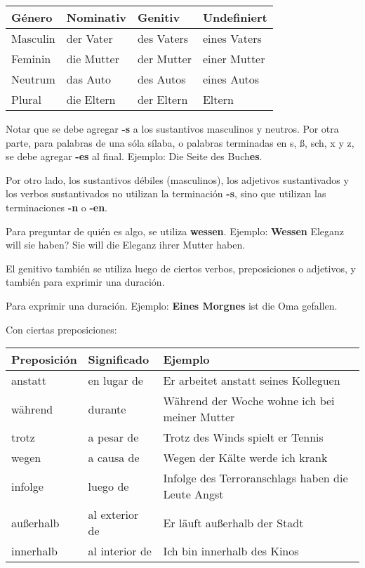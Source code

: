 \begin{tabular}{| l | l | l | l |}
\hline
\textbf{Género} & \textbf{Nominativ} & \textbf{Genitiv} & \textbf{Undefiniert}\\
\hline
Masculin & der Vater & des Vaters & eines Vaters \\
Feminin & die Mutter &  der Mutter & einer Mutter \\
Neutrum & das Auto & des Autos & eines Autos\\
Plural & die Eltern & der Eltern & Eltern \\
\hline
\end{tabular}

Notar que se debe agregar \textbf{-s} a los sustantivos masculinos y neutros. Por otra parte, para palabras de una sóla sílaba, o palabras terminadas en s, ß, sch, x y z, se debe agregar \textbf{-es} al final. Ejemplo: Die Seite des Buch\textbf{es}.

Por otro lado, los sustantivos débiles (masculinos), los adjetivos sustantivados y los verbos sustantivados no utilizan la terminación \textbf{-s}, sino que utilizan las terminaciones \textbf{-n} o \textbf{-en}. 

Para preguntar de quién es algo, se utiliza \textbf{wessen}. Ejemplo: \textbf{Wessen} Eleganz will sie haben? Sie will die Eleganz ihrer Mutter haben.

El genitivo también se utiliza luego de ciertos verbos, preposiciones o adjetivos, y también para exprimir una duración.

Para exprimir una duración. Ejemplo: \textbf{Eines Morgnes} ist die Oma gefallen.

Con ciertas preposiciones:

\begin{tabular}{| l | l | l |}
\hline
\textbf{Preposición} & \textbf{Significado} & \textbf{Ejemplo}\\
\hline
anstatt & en lugar de & Er arbeitet anstatt seines Kolleguen\\
während & durante & Während der Woche wohne ich bei meiner Mutter\\
trotz & a pesar de & Trotz des Winds spielt er Tennis\\
wegen & a causa de & Wegen der Kälte werde ich krank\\
infolge & luego de & Infolge des Terroranschlags haben die Leute Angst\\
außerhalb & al exterior de & Er läuft außerhalb der Stadt\\
innerhalb & al interior de & Ich bin innerhalb des Kinos\\
\hline
\end{tabular}

